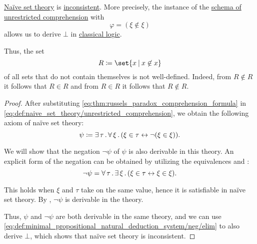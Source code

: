 \begin{theorem}\label{thm:russels_paradox}
  \hyperref[def:naive_set_theory]{Na\"ive set theory} is \hyperref[def:first_order_theory_consistency]{inconsistent}. More precisely, the instance of the \hyperref[def:naive_set_theory/unrestricted_comprehension]{schema of unrestricted comprehension} with
  \begin{equation}\label{eq:thm:russels_paradox_comprehension_formula}
    \varphi = (\xi \not\in \xi)
  \end{equation}
  allows us to derive \( \bot \) in \hyperref[def:classical_logic]{classical logic}.

  Thus, the set
  \begin{equation}\label{eq:thm:russels_paradox_set}
    R \coloneqq \set{ x \given x \not\in x }
  \end{equation}
  of all sets that do not contain themselves is not well-defined. Indeed, from \( R \not\in R \) it follows that \( R \in R \) and from \( R \in R \) it follows that \( R \not\in R \).
\end{theorem}
\begin{proof}
  After substituting \eqref{eq:thm:russels_paradox_comprehension_formula} in \eqref{eq:def:naive_set_theory/unrestricted_comprehension}, we obtain the following axiom of na\"ive set theory:
  \begin{equation}\label{eq:thm:russels_paradox_comprehension_axiom}
    \psi \coloneqq \exists \thinspace \tau \thinspace . \thinspace \forall \thinspace \xi \thinspace . \thinspace (\xi \in \tau \leftrightarrow \neg (\xi \in \xi)).
  \end{equation}

  We will show that the negation \( \neg\psi \) of \( \psi \) is also derivable in this theory. An explicit form of the negation can be obtained by utilizing the equivalences  and :
  \begin{equation*}
    \neg\psi = \forall \thinspace \tau \thinspace . \thinspace \exists \thinspace \xi \thinspace . \thinspace (\xi \in \tau \leftrightarrow \xi \in \xi).
  \end{equation*}

  This holds when \( \xi \) and \( \tau \) take on the same value, hence it is satisfiable in na\"ive set theory. By , \( \neg\psi \) is derivable in the theory.

  Thus, \( \psi \) and \( \neg\psi \) are both derivable in the same theory, and we can use \eqref{eq:def:minimal_propositional_natural_deduction_system/neg/elim} to also derive \( \bot \), which shows that na\"ive set theory is inconsistent.
\end{proof}

